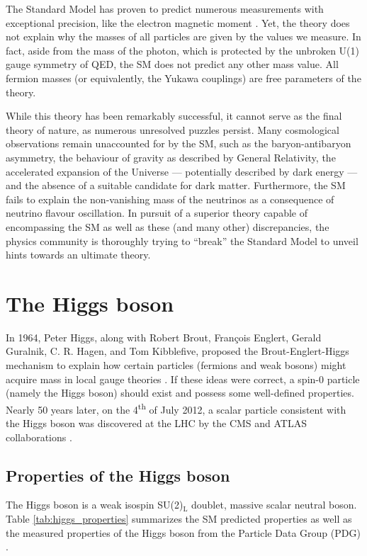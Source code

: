 The Standard Model has proven to predict numerous measurements with exceptional precision, like the electron magnetic moment \cite{osti_22251333}. Yet, the theory does not explain why the masses of all particles are given by the values we measure. In fact, aside from the mass of the photon, which is protected by the unbroken U(1) gauge symmetry of QED, the SM does not predict any other mass value. All fermion masses (or equivalently, the Yukawa couplings) are free parameters of the theory.

While this theory has been remarkably successful, it cannot serve as the final theory of nature, as numerous unresolved puzzles persist. Many cosmological observations remain unaccounted for by the SM, such as the baryon-antibaryon asymmetry, the behaviour of gravity as described by General Relativity, the accelerated expansion of the Universe — potentially described by dark energy — and the absence of a suitable candidate for dark matter. Furthermore, the SM fails to explain the non-vanishing mass of the neutrinos as a consequence of neutrino flavour oscillation. In pursuit of a superior theory capable of encompassing the SM as well as these (and many other) discrepancies, the physics community is thoroughly trying to ``break'' the Standard Model to unveil hints towards an ultimate theory.

\section{The Higgs boson}\label{sec:Higgs_boson}

In 1964, Peter Higgs, along with Robert Brout, François Englert, Gerald Guralnik, C. R. Hagen, and Tom Kibblefive, proposed the Brout-Englert-Higgs mechanism to explain how certain particles (fermions and weak bosons) might acquire mass in local gauge theories \cite{Higgs:1964pj,Englert:1964et,Guralnik:1964eu}. If these ideas were correct, a spin-0 particle (namely the Higgs boson) should exist and possess some well-defined properties. Nearly 50 years later, on the 4\textsuperscript{th} of July 2012, a scalar particle consistent with the Higgs boson was discovered at the LHC by the CMS and ATLAS collaborations \cite{CMS:2012qbp,ATLAS:2012yve}.

\subsection{Properties of the Higgs boson}

The Higgs boson is a weak isospin SU(2)$_{\text{L}}$ doublet, massive scalar neutral boson. Table \ref{tab:higgs_properties} summarizes the SM predicted properties \cite{Djouadi:2005gi, LHCHiggsCrossSectionWorkingGroup:2016ypw} as well as the measured properties of the Higgs boson from the Particle Data Group (PDG) \cite{PDG}.

